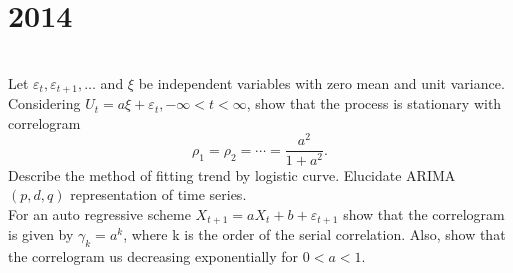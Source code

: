 \section*{2014}
\vspace{-.5cm}
\hrulefill \smallskip\\
 Let $\varepsilon_t,\varepsilon_{t+1},\ldots$ and $\xi$ be independent variables with zero mean and unit variance. Considering $U_t = a\xi + \varepsilon_t, -\infty < t < \infty$, show that the process is stationary with correlogram
\[\rho_1  = \rho_2 = \dotsb = \frac{a^2}{1 + a^2}.\]
\myline
{} Describe the method of fitting trend by logistic curve.
\myline
{} Elucidate ARIMA $(p,d,q)$ representation of time series.\\
For an auto regressive scheme $X_{t+1} = aX_t + b + \varepsilon_{t+1}$ show that the correlogram is given by $\gamma_k = a^k$, where k is the order of the serial correlation. Also, show that the correlogram us decreasing exponentially for $ 0 < a < 1$.
